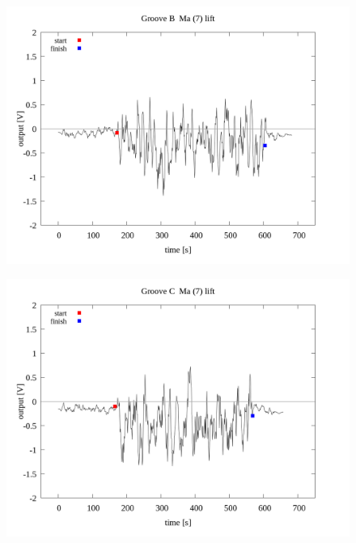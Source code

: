 \documentclass[a4paper]{jsarticle}
\begin{document}
\begin{figure}[htbp]
    \footnotesize
    \begin{center}
        \includegraphics[width=140mm]{../../../../33_result/210806/moving_average/7/lift/02/Groove_B_ma(7)_lift_02.png}
    \end{center}
\end{figure}

\begin{figure}[htbp]
    \footnotesize
    \begin{center}
        \includegraphics[width=140mm]{../../../../33_result/210806/moving_average/7/lift/02/Groove_C_ma(7)_lift_02.png}
    \end{center}
\end{figure}
\end{document}
